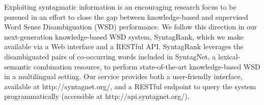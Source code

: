 Exploiting syntagmatic information is an encouraging research focus to be pursued in an effort to close the gap between knowledge-based and supervised Word Sense Disambiguation (WSD) performance. We follow this direction in our next-generation knowledge-based WSD system, SyntagRank, which we make available via a Web interface and a RESTful API. SyntagRank leverages the disambiguated pairs of co-occurring words included in SyntagNet, a lexical-semantic combination resource, to perform state-of-the-art knowledge-based WSD in a multilingual setting. Our service provides both a user-friendly interface, available at http://syntagnet.org/, and a RESTful endpoint to query the system programmatically (accessible at http://api.syntagnet.org/).
